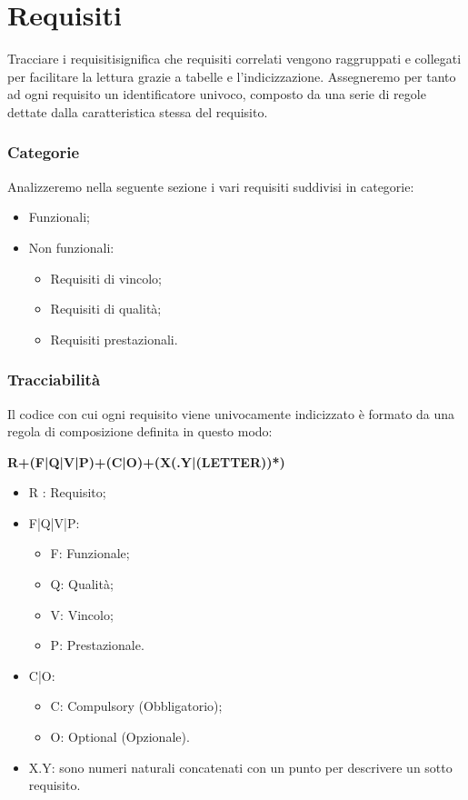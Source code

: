 
\section{Requisiti}
    Tracciare i requisiti\pedice significa che requisiti correlati vengono raggruppati e collegati per facilitare la lettura grazie a tabelle e l'indicizzazione.
    Assegneremo per tanto ad ogni requisito un identificatore univoco, composto da una serie di regole dettate dalla caratteristica stessa del requisito.
    
    \subsubsection{Categorie}
    Analizzeremo nella seguente sezione i vari requisiti suddivisi in categorie:
    \begin{itemize}
        \item Funzionali;
        \item Non funzionali:
            \begin{itemize}
                \item Requisiti di vincolo;
                \item Requisiti di qualità;
                \item Requisiti prestazionali.
            \end{itemize}
    \end{itemize}
    
    \subsubsection{Tracciabilità}
    Il codice con cui ogni requisito viene univocamente indicizzato è formato da una regola di composizione definita in questo modo:
    \newline
    
    \begin{center}
        \textbf{R+(F|Q|V|P)+(C|O)+(X(.Y|(LETTER))*)}    
    \end{center}
    
    
    \begin{itemize}
        \item R : Requisito;
        \item F|Q|V|P:
            \begin{itemize}
                \item F: Funzionale;
                \item Q: Qualità;
                \item V: Vincolo;
                \item P: Prestazionale.
            \end{itemize}
        \item C|O:
            \begin{itemize}
                \item C: Compulsory (Obbligatorio);
                \item O: Optional (Opzionale).
            \end{itemize}
        \item X.Y: sono numeri naturali concatenati con un punto per descrivere un sotto requisito.
    \end{itemize}
    
